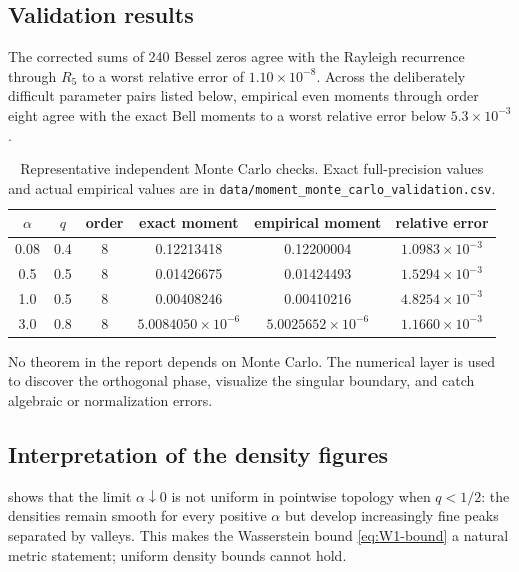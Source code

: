 \documentclass[11pt]{article}
\theoremstyle{definition}
\theoremstyle{remark}
\begin{document}
\subsection{Validation results}

The corrected sums of 240 Bessel zeros agree with the Rayleigh recurrence
through \(R_5\) to a worst relative error of
\(1.10\times10^{-8}\).  Across the deliberately difficult parameter pairs
listed below, empirical even moments through order eight agree with the exact
Bell moments to a worst relative error below \(5.3\times10^{-3}\).

\begin{table}[H]
\centering
\small
\begin{tabular}{cccccc}
\toprule
\(\alpha\) & \(q\) & order & exact moment & empirical moment & relative error\\
\midrule
0.08 & 0.4 & 8 & 0.12213418 & 0.12200004 & $1.0983\times10^{-3}$\\
0.5 & 0.5 & 8 & 0.01426675 & 0.01424493 & $1.5294\times10^{-3}$\\
1.0 & 0.5 & 8 & 0.00408246 & 0.00410216 & $4.8254\times10^{-3}$\\
3.0 & 0.8 & 8 & $5.0084050\times10^{-6}$ & $5.0025652\times10^{-6}$ & $1.1660\times10^{-3}$\\
\bottomrule
\end{tabular}
\caption{Representative independent Monte Carlo checks.  Exact full-precision
values and actual empirical values are in
\protect\nolinkurl{data/moment_monte_carlo_validation.csv}.}
\label{tab:moment-validation}
\end{table}

No theorem in the report depends on Monte Carlo.  The numerical layer is used
to discover the orthogonal phase, visualize the singular boundary, and catch
algebraic or normalization errors.

\subsection{Interpretation of the density figures}

 shows that the limit
\(\alpha\downarrow0\) is not uniform in pointwise topology when \(q<1/2\):
the densities remain smooth for every positive \(\alpha\) but develop
increasingly fine peaks separated by valleys.  This makes the Wasserstein
bound \eqref{eq:W1-bound} a natural metric statement; uniform density bounds
cannot hold.
\end{document}
